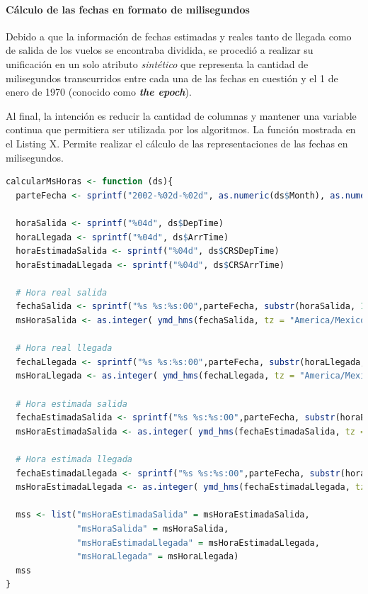 \documentclass[12pt]{article}
\numberwithin{equation}{section}
\numberwithin{table}{section}
\numberwithin{figure}{section}
\begin{document}
\paragraph{Cálculo de las fechas en formato de milisegundos}
Debido a que la información de fechas estimadas y reales tanto de llegada como de salida de los vuelos se encontraba dividida, se procedió a realizar su unificación en un solo atributo \emph{sintético} que representa la cantidad de milisegundos transcurridos entre cada una de las fechas en cuestión y el 1 de enero de 1970 (conocido como \emph{\textbf{the epoch}}).

Al final, la intención es reducir la cantidad de columnas y mantener una variable continua que permitiera ser utilizada por los algoritmos. La función mostrada en el Listing X.
Permite realizar el cálculo de las representaciones de las fechas en milisegundos. 

\begin{lstlisting}[language=R, caption=Transformación de las horas (timestamps) a milisegundos]
calcularMsHoras <- function (ds){
  parteFecha <- sprintf("2002-%02d-%02d", as.numeric(ds$Month), as.numeric(ds$DayofMonth))
  
  horaSalida <- sprintf("%04d", ds$DepTime)
  horaLlegada <- sprintf("%04d", ds$ArrTime)
  horaEstimadaSalida <- sprintf("%04d", ds$CRSDepTime)
  horaEstimadaLlegada <- sprintf("%04d", ds$CRSArrTime)
  
  # Hora real salida
  fechaSalida <- sprintf("%s %s:%s:00",parteFecha, substr(horaSalida, 1, 2), substr(horaSalida, 3, 4))
  msHoraSalida <- as.integer( ymd_hms(fechaSalida, tz = "America/Mexico_City"))
  
  # Hora real llegada
  fechaLlegada <- sprintf("%s %s:%s:00",parteFecha, substr(horaLlegada, 1, 2), substr(horaLlegada, 3, 4))
  msHoraLlegada <- as.integer( ymd_hms(fechaLlegada, tz = "America/Mexico_City"))
  
  # Hora estimada salida
  fechaEstimadaSalida <- sprintf("%s %s:%s:00",parteFecha, substr(horaEstimadaSalida, 1, 2), substr(horaEstimadaSalida, 3, 4))
  msHoraEstimadaSalida <- as.integer( ymd_hms(fechaEstimadaSalida, tz = "America/Mexico_City"))
  
  # Hora estimada llegada
  fechaEstimadaLlegada <- sprintf("%s %s:%s:00",parteFecha, substr(horaEstimadaLlegada, 1, 2), substr(horaEstimadaLlegada, 3, 4))
  msHoraEstimadaLlegada <- as.integer( ymd_hms(fechaEstimadaLlegada, tz = "America/Mexico_City"))
  
  mss <- list("msHoraEstimadaSalida" = msHoraEstimadaSalida,
              "msHoraSalida" = msHoraSalida,
              "msHoraEstimadaLlegada" = msHoraEstimadaLlegada,
              "msHoraLlegada" = msHoraLlegada)
  mss
}
\end{lstlisting}
\end{document}
